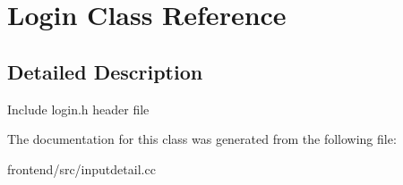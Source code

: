 \hypertarget{classLogin}{\section{Login Class Reference}
\label{classLogin}
}


\subsection{Detailed Description}
Include login.\-h header file 

The documentation for this class was generated from the following file\-:\begin{DoxyCompactItemize}
\item 
frontend/src/inputdetail.\-cc\end{DoxyCompactItemize}
